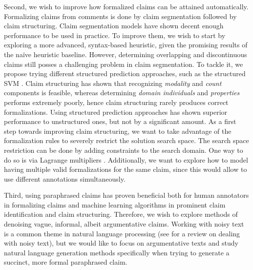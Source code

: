 Second, we wish to improve how formalized claims can be attained automatically.
Formalizing claims from comments is done by claim segmentation followed by
claim structuring.  Claim segmentation models have shown decent enough
performance to be used in practice. To improve them, we wish to start by
exploring a more advanced, syntax-based heuristic, given the promising results
of the na\"ive heuristic baseline.  However, determining overlapping and
discontinuous claims still posses a challenging problem in claim segmentation.
To tackle it, we propose trying different structured prediction approaches, such as
the structured SVM \citep{mcdonald2005flexible}. Claim structuring has shown
that recognizing \emph{modality} and \emph{count} components is feasible,
whereas determining \emph{domain individuals} and \emph{properties}
performs extremely poorly, hence claim structuring rarely produces correct formalizations.
Using structured prediction approaches has shown superior performance 
to unstructured ones, but not by a significant amount.  
As a first step towards improving claim structuring,
we want to take advantage of the formalization rules to severely
restrict the solution search space. The search space restriction can be done by
adding constraints to the search domain. One way to do so is via Lagrange
multipliers \citep{bellman1956dynamic}.  Additionally, we want to explore
how to model having multiple valid formalizations for the same claim, since this would
allow to use different annotations simultaneously. 

Third, using paraphrased claims has proven beneficial both for human annotators
in formalizing claims and machine learning algorithms in prominent claim
identification and claim structuring. Therefore, we wish to explore methods of
denoising vague, informal, albeit argumentative claims.
Working with noisy text is a common theme in natural language processing 
(see \citep{subramaniam2009survey} for a review on dealing with noisy text),
but we would like to focus on argumentative texts and study natural language
generation methods specifically when trying to generate a succinct, more formal 
paraphrased claim.  


